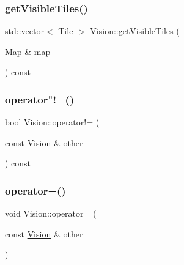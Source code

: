 \mbox{\label{class_vision_a52683d5635319444a095ad79d6745c3b}} 
\subsubsection{\texorpdfstring{get\+Visible\+Tiles()}{getVisibleTiles()}}
{\footnotesize\ttfamily std\+::vector$<$ \mbox{\hyperlink{class_tile}{Tile}} $>$ Vision\+::get\+Visible\+Tiles (\begin{DoxyParamCaption}\item[{\mbox{\hyperlink{class_map}{Map}} \&}]{map }\end{DoxyParamCaption}) const}

\mbox{\label{class_vision_ac71d59ce1d122996ae2a22dba22f2636}} 
\subsubsection{\texorpdfstring{operator"!=()}{operator!=()}}
{\footnotesize\ttfamily bool Vision\+::operator!= (\begin{DoxyParamCaption}\item[{const \mbox{\hyperlink{class_vision}{Vision}} \&}]{other }\end{DoxyParamCaption}) const}

\mbox{\label{class_vision_af3121eb4237a45afbcd98ca28f777e17}} 
\subsubsection{\texorpdfstring{operator=()}{operator=()}}
{\footnotesize\ttfamily void Vision\+::operator= (\begin{DoxyParamCaption}\item[{const \mbox{\hyperlink{class_vision}{Vision}} \&}]{other }\end{DoxyParamCaption})}

\mbox{\label{class_vision_a430c5fbcf645a99efe52a0b820c77e2e}} 
